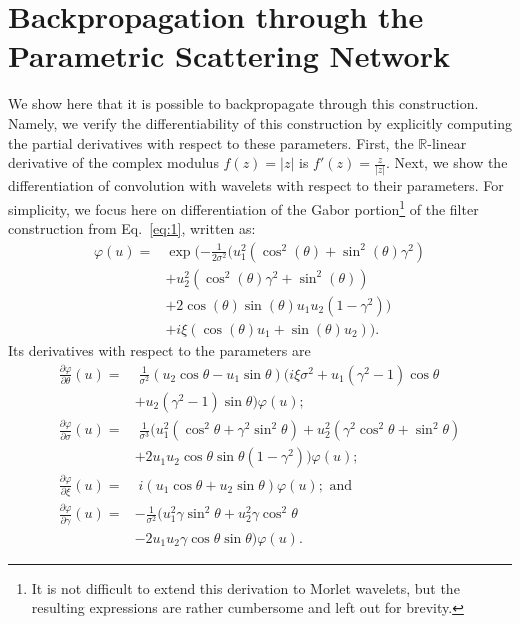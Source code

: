 \documentclass[10pt,twocolumn,letterpaper]{article}
\begin{document}
\section{Backpropagation through the Parametric Scattering Network}
\label{sec:derivative}
We show here that it is possible to backpropagate through this construction. Namely, we verify the differentiability of this construction by explicitly computing the partial derivatives with respect to these parameters. First, the $\mathbb{R}$-linear derivative of the complex modulus $f(z) = |z|$ is $f'(z) = \frac{z}{|z|}$. Next, we show the differentiation of convolution with wavelets with respect to their parameters. For simplicity, we focus here on differentiation of the Gabor portion\footnote{It is not difficult to extend this derivation to Morlet wavelets, but the resulting expressions are rather cumbersome and left out for brevity.} of the filter construction from Eq.~\ref{eq:1}, written as:
\vspace{-5pt}
\begin{align*}
        \varphi(u) = &\exp(-\frac{1}{2\sigma^2}(u_1^2(\cos^2(\theta)+\sin^2(\theta) \gamma^2)\\&+u_2^2(\cos^2(\theta) \gamma^2 + \sin^2(\theta)) \\& + 2\cos(\theta) \sin(\theta) u_1 u_2 (1-\gamma^2)) \\& + i \xi (\cos(\theta) u_1 + \sin(\theta) u_2)). \tag{4}
\end{align*}
Its derivatives with respect to the parameters are
\vspace{-5pt}
\begin{align*}
    \frac{\partial \varphi}{\partial \theta} (u) =& \; \frac{1}{\sigma^2}(u_2 \cos\theta - u_1 \sin\theta)(i\xi \sigma^2 + u_1 (\gamma^2-1)\cos\theta \\& + u_2(\gamma^2-1)\sin\theta)\varphi(u);\tag{5}\\
    \frac{\partial \varphi}{\partial \sigma} (u) =& \; \frac{1}{\sigma^3} (u_1^2(\cos^2\theta+ \gamma^2 \sin^2\theta )+u_2^2(\gamma^2 \cos^2\theta +\sin^2\theta)  \\&+ 2 u_1 u_2 \cos\theta \sin\theta (1-\gamma^2)) \varphi(u); \tag{6} \\
    \frac{\partial \varphi}{\partial \xi} (u) =& \; i(u_1 \cos\theta + u_2 \sin\theta) \varphi(u); \tag{7} \text{ and} \\
    \frac{\partial \varphi}{\partial \gamma} (u) =& -\frac{1}{\sigma^2}(u_1^2 \gamma \sin^2\theta  + u_2^2 \gamma \cos^2\theta  \\&- 2 u_1 u_2 \gamma \cos\theta \sin\theta ) \varphi(u). \tag{8}
\end{align*}
\end{document}

